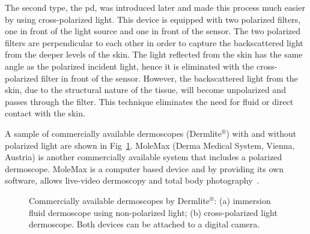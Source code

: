 The second type, the \acf{pd}, was introduced later and made this process much easier by using cross-polarized light. 
This device is equipped with two polarized filters, one in front of the light source and one in front of the sensor. 
The two polarized filters are perpendicular to each other in order to capture the backscattered light from the deeper levels of the skin. 
The light reflected from the skin has the same angle as the polarized incident light, hence it is eliminated with the cross-polarized filter in front of the sensor. 
However, the backscattered light from the skin, due to the structural nature of the tissue, will become unpolarized and passes through the filter.
This technique eliminates the need for fluid or direct contact with the skin.

A sample of commercially available dermoscopes (Dermlite$^{\circledR}$) with and without polarized light are shown in Fig~\ref{fig:fig4}.
MoleMax (Derma Medical System, Vienna, Austria) is another commercially available system that includes a polarized dermoscope.
MoleMax is a computer based device and by providing its own software, allows live-video dermoscopy and total body photography~\cite{marghoob2003instruments,rigel2010evolution}.

\begin{figure}[h]
\centering
{}
\caption[Dermoscopes]{Commercially available dermoscopes by Dermlite$^{\circledR}$:  (a) immersion fluid dermoscope using non-polarized light; (b) cross-polarized light dermoscope. Both devices can be attached to a digital camera.}
\label{fig:fig4}
\end{figure}

